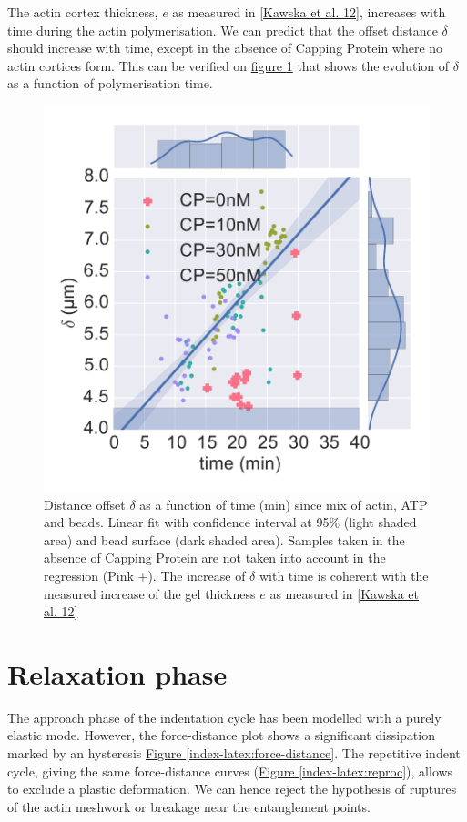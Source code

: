 \documentclass[A4paperpaper,11pt,english]{sphinxmanual}
\begin{document}
The actin cortex thickness, \(e\) as measured in {\hyperref[index-latex:kawska2012]{{[}Kawska et al. 12{]}}},
increases with time during the actin polymerisation. We can predict that the
offset distance \(\delta\) should increase with time, except in the absence of
Capping Protein where no actin cortices form. This can be verified on
\hyperref[index-latex:time-delta-corr]{figure  \ref*{index-latex:time-delta-corr}} that shows the evolution of \(\delta\) as a function
of polymerisation time.
\begin{figure}[htbp]
\centering
\capstart

\includegraphics[width=0.900\linewidth]{time-delta-corr.pdf}
\caption{Distance offset \(\delta\) as a function of time (min) since mix of actin, ATP
and beads. Linear fit with confidence interval at 95\% (light shaded area)
and bead surface (dark shaded area). Samples taken in the absence of Capping
Protein are not taken into account in the regression (Pink +). The increase
of \(\delta\) with time is coherent with the measured increase of the gel
thickness \(e\) as measured in {\hyperref[index-latex:kawska2012]{{[}Kawska et al. 12{]}}}}\label{index-latex:time-delta-corr}\end{figure}


\section{Relaxation phase}
\label{index-latex:id29}
The approach phase of the indentation cycle has been modelled with a purely
elastic mode. However, the force-distance plot shows a significant dissipation
marked by an hysteresis \hyperref[index-latex:force-distance]{Figure  \ref*{index-latex:force-distance}}. The repetitive indent cycle, giving the same
force-distance curves (\hyperref[index-latex:reproc]{Figure  \ref*{index-latex:reproc}}), allows to exclude a plastic deformation.
We can hence reject the hypothesis of ruptures of the
actin meshwork or breakage near the entanglement points.
\end{document}
